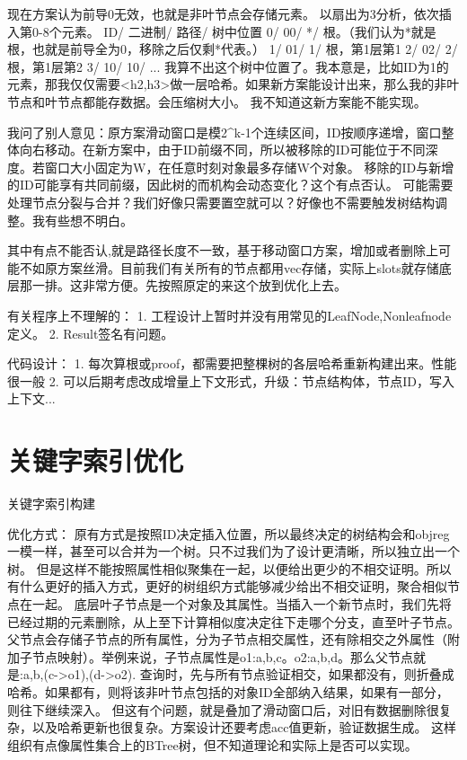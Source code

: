 现在方案认为前导0无效，也就是非叶节点会存储元素。
以扇出为3分析，依次插入第0-8个元素。
ID/ 二进制/ 路径/   树中位置
0/  00/    */    根。（我们认为*就是根，也就是前导全为0，移除之后仅剩*代表。）
1/  01/    1/    根，第1层第1
2/  02/    2/    根，第1层第2     
3/  10/    10/    
... 
我算不出这个树中位置了。我本意是，比如ID为1的元素，那我仅仅需要<h2,h3>做一层哈希。如果新方案能设计出来，那么我的非叶节点和叶节点都能存数据。会压缩树大小。
我不知道这新方案能不能实现。

我问了别人意见：原方案滑动窗口是模2^k-1个连续区间，ID按顺序递增，窗口整体向右移动。在新方案中，由于ID前缀不同，所以被移除的ID可能位于不同深度。若窗口大小固定为W，在任意时刻对象最多存储W个对象。
移除的ID与新增的ID可能享有共同前缀，因此树的而机构会动态变化？这个有点否认。
可能需要处理节点分裂与合并？我们好像只需要置空就可以？好像也不需要触发树结构调整。我有些想不明白。

其中有点不能否认,就是路径长度不一致，基于移动窗口方案，增加或者删除上可能不如原方案丝滑。目前我们有关所有的节点都用vec存储，实际上slots就存储底层那一排。这非常方便。先按照原定的来这个放到优化上去。


有关程序上不理解的：
1. 工程设计上暂时并没有用常见的LeafNode,Nonleafnode定义。
2. Result签名有问题。


代码设计：
1. 每次算根或proof，都需要把整棵树的各层哈希重新构建出来。性能很一般
2. 可以后期考虑改成增量上下文形式，升级：节点结构体，节点ID，写入上下文...


\section{关键字索引优化}
关键字索引构建

优化方式：
原有方式是按照ID决定插入位置，所以最终决定的树结构会和objreg一模一样，甚至可以合并为一个树。只不过我们为了设计更清晰，所以独立出一个树。
但是这样不能按照属性相似聚集在一起，以便给出更少的不相交证明。所以有什么更好的插入方式，更好的树组织方式能够减少给出不相交证明，聚合相似节点在一起。
底层叶子节点是一个对象及其属性。当插入一个新节点时，我们先将已经过期的元素删除，从上至下计算相似度决定往下走哪个分支，直至叶子节点。
父节点会存储子节点的所有属性，分为子节点相交属性，还有除相交之外属性（附加子节点映射）。举例来说，子节点属性是o1:a,b,c。o2:a,b,d。那么父节点就是:a,b,(c->o1),(d->o2).
查询时，先与所有节点验证相交，如果都没有，则折叠成哈希。如果都有，则将该非叶节点包括的对象ID全部纳入结果，如果有一部分，则往下继续深入。
但这有个问题，就是叠加了滑动窗口后，对旧有数据删除很复杂，以及哈希更新也很复杂。方案设计还要考虑acc值更新，验证数据生成。
这样组织有点像属性集合上的BTree树，但不知道理论和实际上是否可以实现。

